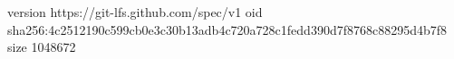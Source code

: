 version https://git-lfs.github.com/spec/v1
oid sha256:4c2512190c599cb0e3c30b13adb4c720a728c1fedd390d7f8768c88295d4b7f8
size 1048672
